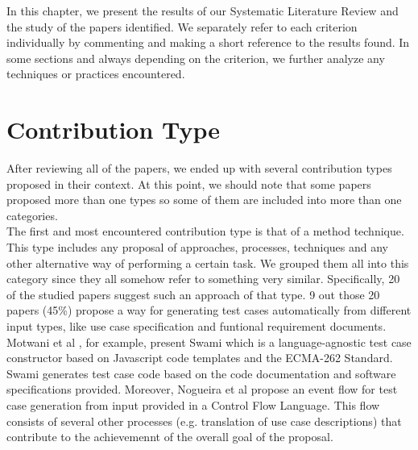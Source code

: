 In this chapter, we present the results of our Systematic Literature Review and the study of the papers identified. We separately refer to 
each criterion individually by commenting and making a short reference to the results found. In some sections and always depending on the criterion, we further analyze any 
techniques or practices encountered. 

\section {Contribution Type}
After reviewing all of the papers, we ended up with several contribution types proposed in their context. At this point, we should note that some papers 
proposed more than one types so some of them are included into more than one categories. \\

The first and most encountered contribution type is that of a method technique. This type includes any proposal of approaches, processes, techniques and any 
other alternative way of performing a certain task. We grouped them all into this category since they all somehow refer to something very similar. Specifically, 20 of the
studied papers suggest such an approach of that type. 9 out those 20 papers (45\%) propose a way for generating test cases automatically from different input types, like 
use case specification and funtional requirement documents. Motwani et al \cite{8812070}, for example, present Swami which is a language-agnostic test case constructor 
based on Javascript code templates and the ECMA-262 Standard. Swami generates test case code based on the code documentation and software specifications provided. Moreover, 
Nogueira et al \cite{nogueira2015automatic} propose an event flow for test case generation from input provided in a Control Flow Language. This flow consists of several other 
processes (e.g. translation of use case descriptions) that contribute to the achievemennt of the overall goal of the proposal. \\

